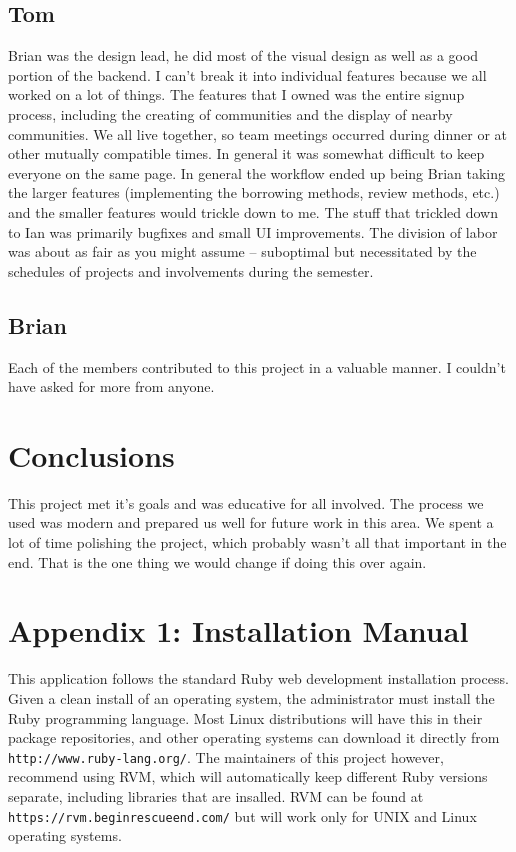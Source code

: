 \documentclass{acm_proc_article-sp}
\begin{document}
\subsection{Tom}
Brian was the design lead, he did most of the visual design as well as a good portion of the backend. I can't break it into individual features because we all worked on a lot of things. The features that I owned was the entire signup process, including the creating of communities and the display of nearby communities.
We all live together, so team meetings occurred during dinner or at other mutually compatible times. In general it was somewhat difficult to keep everyone on the same page. In general the workflow ended up being Brian taking the larger features (implementing the borrowing methods, review methods, etc.) and the smaller features would trickle down to me. The stuff that trickled down to Ian was primarily bugfixes and small UI improvements.
The division of labor was about as fair as you might assume -- suboptimal but necessitated by the schedules of projects and involvements during the semester.

\subsection{Brian}
Each of the members contributed to this project in a valuable manner.  I couldn't have asked for more from anyone.
\section{Conclusions}
This project met it's goals and was educative for all involved.  The process we used was modern and prepared us well for future work in this area.  We spent a lot of time polishing the project, which probably wasn't all that important in the end.  That is the one thing we would change if doing this over again.
\section{Appendix 1: Installation Manual}
This application follows the standard Ruby web development installation process.  Given a clean install of an operating system, the administrator must install the Ruby programming language. Most Linux distributions will have this in their package repositories, and other operating systems can download it directly from \texttt{http://www.ruby-lang.org/}.  The maintainers of this project however, recommend using RVM, which will automatically keep different Ruby versions separate, including libraries that are insalled. RVM can be found at \texttt{https://rvm.beginrescueend.com/} but will work only for UNIX and Linux operating systems.  
\end{document}
